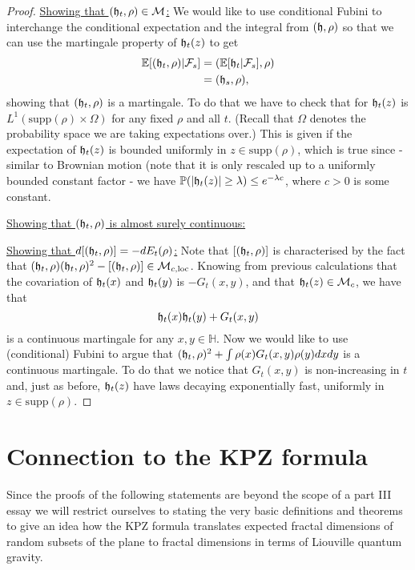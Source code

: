 \documentclass[11pt,reqno]{amsart}
\numberwithin{equation}{section}
\newcommand{\fh}{{\frak h}}
\begin{document}
\begin{proof}
	\underline{Showing that $(\fh_t,\rho)\in\mathcal M$:} We would like to use conditional Fubini to interchange the conditional expectation and the integral from $(\fh,\rho)$ so that we can use the martingale property of $\fh_t(z)$ to get
		\begin{align*}
			\mathbb E[(\fh_t,\rho)|\mathcal F_s]&=(\mathbb E[\fh_t|\mathcal F_s],\rho)\\
			&=(\fh_s,\rho),
		\end{align*}
		showing that $(\fh_t,\rho)$ is a martingale. To do that we have to check that for $\fh_t(z)$ is $L^1(\text{supp}(\rho)\times\Omega)$ for any fixed $\rho$ and all $t$. (Recall that $\Omega$ denotes the probability space we are taking expectations over.)
		This is given if the expectation of $\fh_t(z)$ is bounded uniformly in $z\in\text{supp}(\rho)$, which is true since - similar to Brownian motion (note that it is only rescaled up to a uniformly bounded constant factor - we have $\mathbb P(|\fh_t(z)|\geq\lambda)\leq e^{-\lambda c}$, where $c>0$ is some constant.
	
	\underline{Showing that $(\fh_t,\rho)$ is almost surely continuous:} 
	
	\underline{Showing that $d[(\fh_t,\rho)]=-dE_t(\rho)$:} Note that $[(\fh_t,\rho)]$ is characterised by the fact that $(\fh_t,\rho)(\fh_t,\rho)^2-[(\fh_t,\rho)]\in\mathcal M_{c,\text{loc}}$. Knowing from previous calculations that the covariation of $\fh_t(x)$ and $\fh_t(y)$ is $-G_t(x,y)$, and that $\fh_t(z)\in\mathcal M_c$, we have that $$\fh_t(x)\fh_t(y)+G_t(x,y)$$ is a continuous martingale for any $x,y\in\mathbb H$. Now we would like to use (conditional) Fubini to argue that $(\fh_t,\rho)^2+\int \rho(x)G_t(x,y)\rho(y)dxdy$ is a continuous martingale. To do that we notice that $G_t(x,y)$ is non-increasing in $t$ and, just as before, $\fh_t(z)$ have laws decaying exponentially fast, uniformly in $z\in\text{supp}(\rho)$.
\end{proof}

\section{Connection to the KPZ formula}

Since the proofs of the following statements are beyond the scope of a part III essay we will restrict ourselves to stating the very basic definitions and theorems to give an idea how the KPZ formula translates expected fractal dimensions of random subsets of the plane to fractal dimensions in terms of Liouville quantum gravity.
\end{document}
